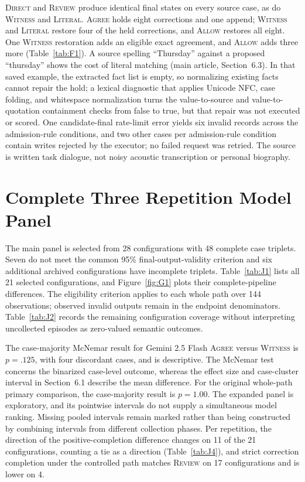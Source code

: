 \documentclass[acmsmall,review]{acmart}
\newcommand{\agree}{\textsc{Agree}}
\newcommand{\allow}{\textsc{Allow}}
\newcommand{\literal}{\textsc{Literal}}
\newcommand{\witness}{\textsc{Witness}}
\newcommand{\review}{\textsc{Review}}
\newcommand{\direct}{\textsc{Direct}}
\begin{document}
\direct{} and \review{} produce identical final states on every source case, as do \witness{} and \literal{}. \agree{} holds eight corrections and one append; \witness{} and \literal{} restore four of the held corrections, and \allow{} restores all eight. One \witness{} restoration adds an eligible exact agreement, and \allow{} adds three more (Table~\ref{tab:F1}). A source spelling ``Thursday'' against a proposed ``thursday'' shows the cost of literal matching (main article, Section~6.3). In that saved example, the extracted fact list is empty, so normalizing existing facts cannot repair the hold; a lexical diagnostic that applies Unicode NFC, case folding, and whitespace normalization turns the value-to-source and value-to-quotation containment checks from false to true, but that repair was not executed or scored. One candidate-final rate-limit error yields six invalid records across the admission-rule conditions, and two other cases per admission-rule condition contain writes rejected by the executor; no failed request was retried. The source is written task dialogue, not noisy acoustic transcription or personal biography.

\FloatBarrier
\setcounter{figure}{0}\setcounter{table}{0}
\renewcommand{\thefigure}{G\arabic{figure}}
\renewcommand{\thetable}{G\arabic{table}}
\section{Complete Three Repetition Model Panel}
The main panel is selected from 28 configurations with 48 complete case triplets. Seven do not meet the common 95\% final-output-validity criterion and six additional archived configurations have incomplete triplets. Table~\ref{tab:J1} lists all 21 selected configurations, and Figure~\ref{fig:G1} plots their complete-pipeline differences. The eligibility criterion applies to each whole path over 144 observations; observed invalid outputs remain in the endpoint denominators. Table~\ref{tab:J2} records the remaining configuration coverage without interpreting uncollected episodes as zero-valued semantic outcomes.

The case-majority McNemar result for Gemini 2.5 Flash \agree{} versus \witness{} is $p=.125$, with four discordant cases, and is descriptive. The McNemar test concerns the binarized case-level outcome, whereas the effect size and case-cluster interval in Section~6.1 describe the mean difference. For the original whole-path primary comparison, the case-majority result is $p=1.00$. The expanded panel is exploratory, and its pointwise intervals do not supply a simultaneous model ranking. Missing pooled intervals remain marked rather than being constructed by combining intervals from different collection phases. Per repetition, the direction of the positive-completion difference changes on 11 of the 21 configurations, counting a tie as a direction (Table~\ref{tab:J4}), and strict correction completion under the controlled path matches \review{} on 17 configurations and is lower on 4.
\end{document}
